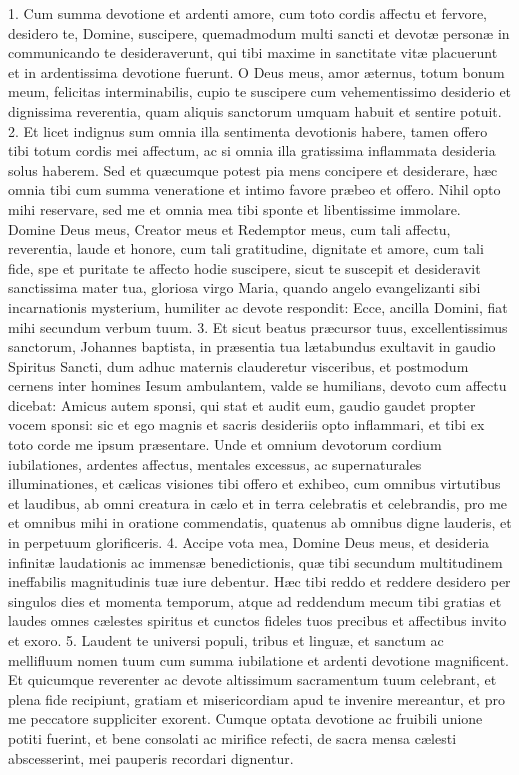 \documentclass[twoside]{article}
\begin{document}
1. Cum summa devotione et ardenti amore, cum toto cordis affectu et fervore, desidero te, Domine, suscipere, quemadmodum multi sancti et devotæ personæ in communicando te desideraverunt, qui tibi maxime in sanctitate vitæ placuerunt et in ardentissima devotione fuerunt. O Deus meus, amor æternus, totum bonum meum, felicitas interminabilis, cupio te suscipere cum vehementissimo desiderio et dignissima reverentia, quam aliquis sanctorum umquam habuit et sentire potuit.
2. Et licet indignus sum omnia illa sentimenta devotionis habere, tamen offero tibi totum cordis mei affectum, ac si omnia illa gratissima inflammata desideria solus haberem. Sed et quæcumque potest pia mens concipere et desiderare, hæc omnia tibi cum summa veneratione et intimo favore præbeo et offero. Nihil opto mihi reservare, sed me et omnia mea tibi sponte et libentissime immolare. Domine Deus meus, Creator meus et Redemptor meus, cum tali affectu, reverentia, laude et honore, cum tali gratitudine, dignitate et amore, cum tali fide, spe et puritate te affecto hodie suscipere, sicut te suscepit et desideravit sanctissima mater tua, gloriosa virgo Maria, quando angelo evangelizanti sibi incarnationis mysterium, humiliter ac devote respondit: Ecce, ancilla Domini, fiat mihi secundum verbum tuum.
3. Et sicut beatus præcursor tuus, excellentissimus sanctorum, Johannes baptista, in præsentia tua lætabundus exultavit in gaudio Spiritus Sancti, dum adhuc maternis clauderetur visceribus, et postmodum cernens inter homines Iesum ambulantem, valde se humilians, devoto cum affectu dicebat: Amicus autem sponsi, qui stat et audit eum, gaudio gaudet propter vocem sponsi: sic et ego magnis et sacris desideriis opto inflammari, et tibi ex toto corde me ipsum præsentare. Unde et omnium devotorum cordium iubilationes, ardentes affectus, mentales excessus, ac supernaturales illuminationes, et cælicas visiones tibi offero et exhibeo, cum omnibus virtutibus et laudibus, ab omni creatura in cælo et in terra celebratis et celebrandis, pro me et omnibus mihi in oratione commendatis, quatenus ab omnibus digne lauderis, et in perpetuum glorificeris.
4. Accipe vota mea, Domine Deus meus, et desideria infinitæ laudationis ac immensæ benedictionis, quæ tibi secundum multitudinem ineffabilis magnitudinis tuæ iure debentur. Hæc tibi reddo et reddere desidero per singulos dies et momenta temporum, atque ad reddendum mecum tibi gratias et laudes omnes cælestes spiritus et cunctos fideles tuos precibus et affectibus invito et exoro.
5. Laudent te universi populi, tribus et linguæ, et sanctum ac mellifluum nomen tuum cum summa iubilatione et ardenti devotione magnificent. Et quicumque reverenter ac devote altissimum sacramentum tuum celebrant, et plena fide recipiunt, gratiam et misericordiam apud te invenire mereantur, et pro me peccatore suppliciter exorent. Cumque optata devotione ac fruibili unione potiti fuerint, et bene consolati ac mirifice refecti, de sacra mensa cælesti abscesserint, mei pauperis recordari dignentur.
\end{document}
